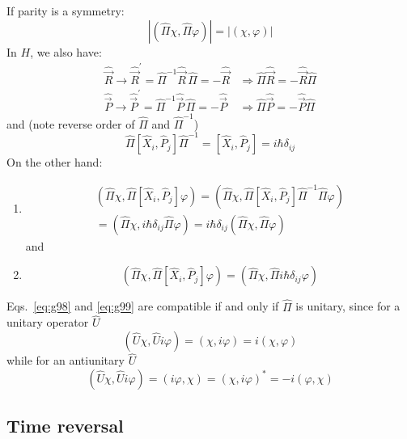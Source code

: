 \documentclass[12pt]{article}
\newcommand{\be}{\begin{equation}}
\newcommand{\ee}{\end{equation}}
\begin{document}
If parity is a symmetry:
\be
|(\hat{\Pi}\chi,\hat{\Pi}\varphi)| = |(\chi,\varphi)|
\ee
In $H$, we also have:
\be
\begin{aligned}
\hat{\vec{R}} \rightarrow \hat{\vec{R}}^\prime = \hat{\Pi}^{-1} \hat{\vec{R}}\,\hat{\Pi} = -\hat{\vec{R}} &\Rightarrow \hat{\Pi}\hat{\vec{R}} = - \hat{\vec{R}}\hat{\Pi}\\
\hat{\vec{P}} \rightarrow \hat{\vec{P}}^\prime = \hat{\Pi}^{-1} \hat{\vec{P}}\,\hat{\Pi} = -\hat{\vec{P}}
&\Rightarrow \hat{\Pi}\hat{\vec{P}} = - \hat{\vec{P}}\hat{\Pi}
\end{aligned}
\ee
and (note reverse order of $\hat{\Pi}$ and $\hat{\Pi}^{-1}$)
\be
\hat{\Pi} [\hat{X}_i,\hat{P}_j] \hat{\Pi}^{-1} = [\hat{X}_i,\hat{P}_j] = i \hbar \delta_{ij}
\ee
On the other hand:
\begin{enumerate}
\item 
\be
\begin{gathered}
\left(\hat{\Pi} \chi, \hat{\Pi}\left[\hat{X}_{i}, \hat{P}_{j}\right] \varphi\right)=\left(\hat{\Pi} \chi, \hat{\Pi}\left[\hat{X}_{i}, \hat{P}_{j}\right] \hat{\Pi}^{-1} \hat{\Pi}\varphi\right)\\
=\left(\hat{\Pi} \chi, i \hbar \delta_{i j} \hat{\Pi} \varphi\right)=i \hbar \delta_{i j}(\hat{\Pi} \chi, \hat{\Pi} \varphi)
\end{gathered}
\label{eq:g98}
\ee
and
\item
\be
\left(\hat{\Pi} \chi, \hat{\Pi}\left[\hat{X}_{i}, \hat{P}_{j}\right] \varphi\right) = 
\left(\hat{\Pi} \chi, \hat{\Pi} i \hbar \delta_{i j} \varphi\right)
\label{eq:g99}
\ee
\end{enumerate}
Eqs.~\eqref{eq:g98} and \eqref{eq:g99} are compatible if and only if
$\hat{\Pi}$ is unitary, since
for a unitary operator $\hat{U}$
\be
(\hat{U}\chi,\hat{U}i\varphi) = (\chi,i\varphi) = i(\chi,\varphi)
\ee
 while for an antiunitary $\hat{U}$
\be
(\hat{U}\chi,\hat{U}i\varphi) = (i\varphi,\chi) = (\chi,i\varphi)^* = -i(\varphi,\chi)
\ee
 

\subsection{Time reversal}
\end{document}

